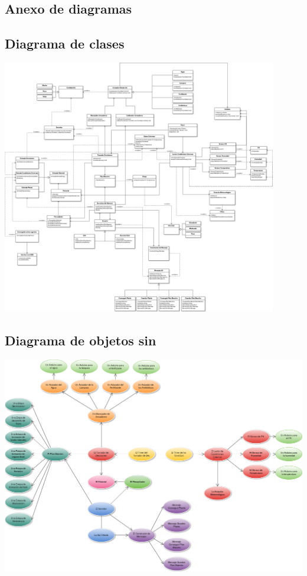 \begin{landscape}
\section{Anexo de diagramas}
    \subsection{Diagrama de clases}
        \includegraphics[width=0.9\textwidth]{img/clases.png}
    \newpage

    \subsection{Diagrama de objetos sin \historial{}}
        \includegraphics[width=1.2\textwidth]{img/objetosGeneral.png}
    \newpage


\end{landscape}
